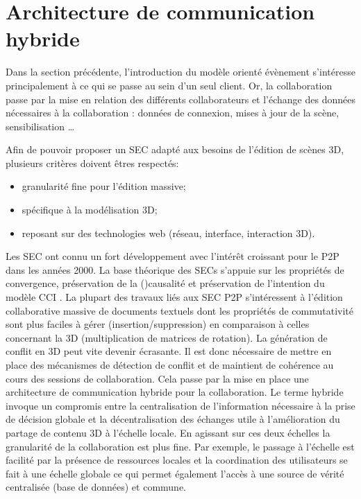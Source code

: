 \section{Architecture de communication hybride}


Dans la section précédente, l'introduction du modèle orienté évènement s'intéresse 
principalement à ce qui se passe au sein d'un seul client. Or, la collaboration 
passe par la mise en relation des différents collaborateurs et l'échange des 
données nécessaires à la collaboration : données de connexion, mises à jour de la 
scène, sensibilisation \dots 

Afin de pouvoir proposer un \gls{SEC} adapté aux besoins de l'édition de scènes 
3D, plusieurs critères doivent êtres respectés: 
\begin{itemize}
	\item granularité fine pour l'édition massive;
	\item spécifique à la modélisation 3D;
	\item reposant sur des technologies web (réseau, interface, interaction 3D).
\end{itemize}

Les \gls{SEC} ont connu un fort développement avec l'intérêt croissant 
pour le \gls{P2P} dans les années 2000. 
La base théorique des \glspl{SEC} s'appuie sur les propriétés de 
convergence, préservation de la 
()causalité et préservation de l'intention du modèle \acrshort{CCI} 
\cite{Sun1998}. 
La plupart des travaux liés aux \gls{SEC} \gls{P2P} s'intéressent à 
l'édition collaborative massive de documents textuels dont les propriétés 
de commutativité sont plus faciles à gérer (insertion/suppression) en 
comparaison à celles concernant la 3D (multiplication de matrices de 
rotation). La génération de conflit en 3D peut vite devenir écrasante. Il est 
donc nécessaire de mettre en place des mécanismes de détection de 
conflit et de maintient de cohérence au cours des sessions de 
collaboration. 
Cela passe par la mise en place une architecture de communication 
hybride pour la collaboration. 
Le terme \og hybride\fg{} invoque un compromis entre la 
centralisation de l'information nécessaire à la prise de décision globale et 
la décentralisation des échanges utile à l'amélioration du partage de 
contenu 3D à l'échelle locale. 
En agissant sur ces deux échelles la granularité de la collaboration est plus fine. 
Par exemple, le passage à l'échelle est facilité par la présence de 
ressources locales et la coordination des utilisateurs se fait à une échelle 
globale ce qui permet également l'accès à une source de vérité 
centralisée (base de données) et commune.

